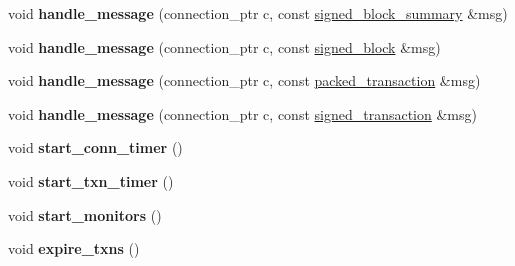 \begin{DoxyCompactItemize}
\item 
\mbox{\label{classaacio_1_1net__plugin__impl_a3b455ff845541cc93e8abcbf534c2be5}} 
void {\bfseries handle\+\_\+message} (connection\+\_\+ptr c, const \mbox{\hyperlink{structaacio_1_1chain_1_1signed__block__summary}{signed\+\_\+block\+\_\+summary}} \&msg)
\item 
\mbox{\label{classaacio_1_1net__plugin__impl_ae42d9272a58a90e3f2d3e55462a16f99}} 
void {\bfseries handle\+\_\+message} (connection\+\_\+ptr c, const \mbox{\hyperlink{structaacio_1_1chain_1_1signed__block}{signed\+\_\+block}} \&msg)
\item 
\mbox{\label{classaacio_1_1net__plugin__impl_a1a71115760b31d63e64d5db67a9fd7ce}} 
void {\bfseries handle\+\_\+message} (connection\+\_\+ptr c, const \mbox{\hyperlink{structaacio_1_1chain_1_1packed__transaction}{packed\+\_\+transaction}} \&msg)
\item 
\mbox{\label{classaacio_1_1net__plugin__impl_af3ba56eca9a64930faa1ec1195b0b4f7}} 
void {\bfseries handle\+\_\+message} (connection\+\_\+ptr c, const \mbox{\hyperlink{structaacio_1_1chain_1_1signed__transaction}{signed\+\_\+transaction}} \&msg)
\item 
\mbox{\label{classaacio_1_1net__plugin__impl_a15da42e3077bb875d2ee2052a4dccc95}} 
void {\bfseries start\+\_\+conn\+\_\+timer} ()
\item 
\mbox{\label{classaacio_1_1net__plugin__impl_a4ae7fef3726a582d62671a98325b8201}} 
void {\bfseries start\+\_\+txn\+\_\+timer} ()
\item 
\mbox{\label{classaacio_1_1net__plugin__impl_ac115da0343528d341dd6591593a24ddd}} 
void {\bfseries start\+\_\+monitors} ()
\item 
\mbox{\label{classaacio_1_1net__plugin__impl_a88cb8c60f46b9b9ad0ea4d2132de7ed0}} 
void {\bfseries expire\+\_\+txns} ()
\item 
\mbox{\label{classaacio_1_1net__plugin__impl_ae42d7f8703c7d85926d1d1e7a380e2d2}} 

\end{DoxyCompactItemize}
